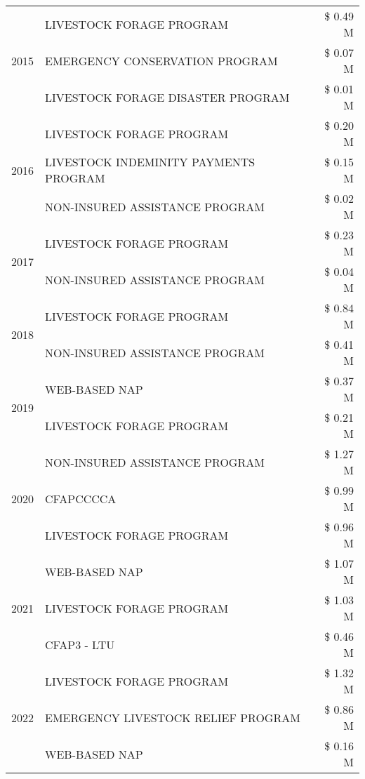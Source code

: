 \begin{tabular}{llr}
\cline{1-3}
\multirow[t]{3}{*}{2015} & LIVESTOCK FORAGE PROGRAM & \$ 0.49 M \\
 & EMERGENCY CONSERVATION PROGRAM & \$ 0.07 M \\
 & LIVESTOCK FORAGE DISASTER PROGRAM & \$ 0.01 M \\
\cline{1-3}
\multirow[t]{3}{*}{2016} & LIVESTOCK FORAGE PROGRAM & \$ 0.20 M \\
 & LIVESTOCK INDEMINITY PAYMENTS PROGRAM & \$ 0.15 M \\
 & NON-INSURED ASSISTANCE PROGRAM & \$ 0.02 M \\
\cline{1-3}
\multirow[t]{2}{*}{2017} & LIVESTOCK FORAGE PROGRAM & \$ 0.23 M \\
 & NON-INSURED ASSISTANCE PROGRAM & \$ 0.04 M \\
\cline{1-3}
\multirow[t]{2}{*}{2018} & LIVESTOCK FORAGE PROGRAM & \$ 0.84 M \\
 & NON-INSURED ASSISTANCE PROGRAM & \$ 0.41 M \\
\cline{1-3}
\multirow[t]{2}{*}{2019} & WEB-BASED NAP & \$ 0.37 M \\
 & LIVESTOCK FORAGE PROGRAM & \$ 0.21 M \\
\cline{1-3}
\multirow[t]{3}{*}{2020} & NON-INSURED ASSISTANCE PROGRAM & \$ 1.27 M \\
 & CFAPCCCCA & \$ 0.99 M \\
 & LIVESTOCK FORAGE PROGRAM & \$ 0.96 M \\
\cline{1-3}
\multirow[t]{3}{*}{2021} & WEB-BASED NAP & \$ 1.07 M \\
 & LIVESTOCK FORAGE PROGRAM & \$ 1.03 M \\
 & CFAP3 - LTU & \$ 0.46 M \\
\cline{1-3}
\multirow[t]{3}{*}{2022} & LIVESTOCK FORAGE PROGRAM & \$ 1.32 M \\
 & EMERGENCY LIVESTOCK RELIEF PROGRAM & \$ 0.86 M \\
 & WEB-BASED NAP & \$ 0.16 M \\
\cline{1-3}
\bottomrule
\end{tabular}
